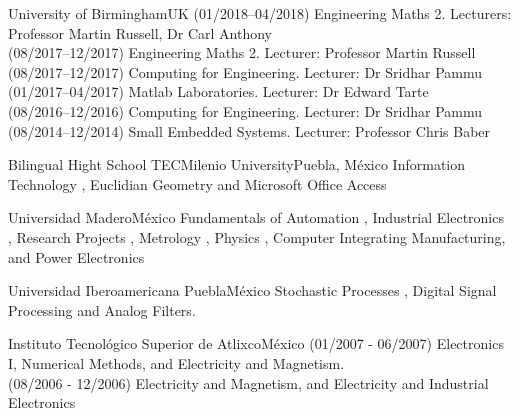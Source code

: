 \documentclass[10pt,a4paper,roman]{moderncv}
\begin{document}
{University of Birmingham}{UK}{}
{
(01/2018--04/2018) Engineering Maths 2. Lecturers: Professor Martin Russell, Dr Carl Anthony \\
(08/2017--12/2017) Engineering Maths 2. Lecturer: Professor Martin Russell \\
(08/2017--12/2017) Computing for Engineering. Lecturer: Dr Sridhar Pammu \\
(01/2017--04/2017) Matlab Laboratories. Lecturer: Dr Edward Tarte \\
(08/2016--12/2016) Computing for Engineering. Lecturer: Dr Sridhar Pammu \\
(08/2014--12/2014) Small Embedded Systems. Lecturer: Professor Chris Baber
}

{Bilingual Hight School TECMilenio University}{Puebla, M\'exico}{}
{
Information Technology \href{https://sites.google.com/site/perezxochicale/teaching/iit}{\faExternalLink},
Euclidian Geometry  \href{https://sites.google.com/site/perezxochicale/teaching/euclidean-geometry}{\faExternalLink}
and
Microsoft Office Access \href{https://sites.google.com/site/perezxochicale/teaching/moa}{\faExternalLink}
}

{Universidad Madero}{M\'exico}{}
{Fundamentals of Automation
\href{https://sites.google.com/site/perezxochicale/digital-electronics}{\faExternalLink},
Industrial Electronics \href{https://sites.google.com/site/perezxochicale/ie}{\faExternalLink},
Research Projects \href{https://sites.google.com/site/perezxochicale/latex/thesistemplate}{\faExternalLink},
Metrology \href{https://sites.google.com/site/perezxochicale/metrology}{\faExternalLink},
Physics \href{http://goo.gl/fffnG}{\faExternalLink},
Computer Integrating Manufacturing, and Power Electronics
}

{Universidad Iberoamericana Puebla}{M\'exico}{}
{Stochastic Processes 
\href{https://sites.google.com/site/perezxochicale/stochastic-processes-course}{\faExternalLink},
Digital Signal Processing
\href{https://sites.google.com/site/perezxochicale/digital-signal-processing-course}{\faExternalLink}
and Analog Filters.
}

{Instituto Tecnol\'ogico Superior de Atlixco}{M\'exico}{}
{
(01/2007 - 06/2007) Electronics I, Numerical Methods, and Electricity and Magnetism. \\ 
(08/2006 - 12/2006) Electricity and Magnetism, and Electricity and Industrial Electronics 
}
\end{document}
